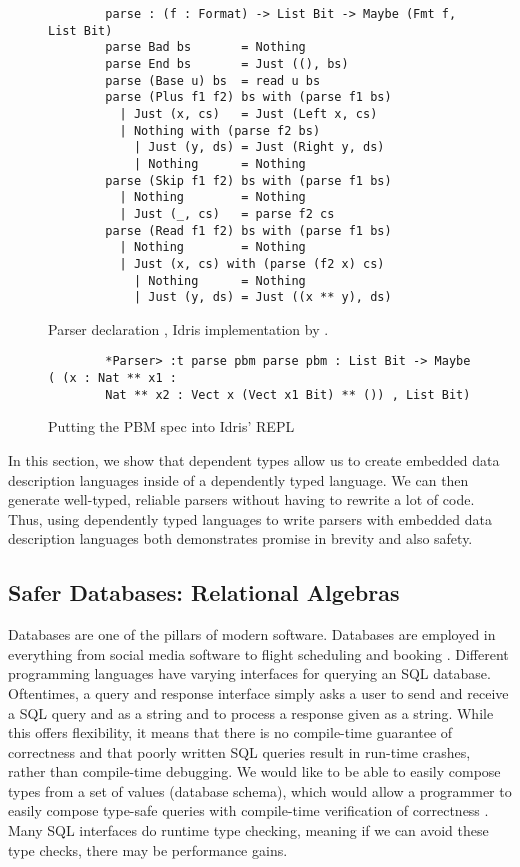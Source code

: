 \begin{figure}[h]
    \caption{Parser declaration \cite{power_of_pi}, Idris implementation by
    \cite{idris_pop}.}
    \label{parser}
    \begin{lstlisting}
        parse : (f : Format) -> List Bit -> Maybe (Fmt f, List Bit)
        parse Bad bs       = Nothing
        parse End bs       = Just ((), bs)
        parse (Base u) bs  = read u bs
        parse (Plus f1 f2) bs with (parse f1 bs)
          | Just (x, cs)   = Just (Left x, cs)
          | Nothing with (parse f2 bs)
            | Just (y, ds) = Just (Right y, ds)
            | Nothing      = Nothing
        parse (Skip f1 f2) bs with (parse f1 bs)
          | Nothing        = Nothing
          | Just (_, cs)   = parse f2 cs
        parse (Read f1 f2) bs with (parse f1 bs)
          | Nothing        = Nothing
          | Just (x, cs) with (parse (f2 x) cs)
            | Nothing      = Nothing
            | Just (y, ds) = Just ((x ** y), ds)
    \end{lstlisting}
\end{figure}

\begin{figure}
    \caption{Putting the PBM spec into Idris' REPL}
    \label{repl}
    \begin{lstlisting}
        *Parser> :t parse pbm parse pbm : List Bit -> Maybe ( (x : Nat ** x1 :
        Nat ** x2 : Vect x (Vect x1 Bit) ** ()) , List Bit)
    \end{lstlisting}
\end{figure}

In this section, we show that dependent types allow us to create embedded data
description languages inside of a dependently typed language. We can then
generate well-typed, reliable parsers without having to rewrite a lot of code.
Thus, using dependently typed languages to write parsers with embedded data
description languages both demonstrates promise in brevity and also safety. 

\subsection{Safer Databases: Relational Algebras}

Databases are one of the pillars of modern software. Databases are employed in
everything from social media software \cite{tao} to flight scheduling and
booking \cite{flights}. Different programming languages have varying interfaces
for querying an SQL database. Oftentimes, a query and response interface simply
asks a user to send and receive a SQL query and as a string and to process a
response given as a string. While this offers flexibility, it means that there
is no compile-time guarantee of correctness and that poorly written SQL queries
result in run-time crashes, rather than compile-time debugging. We would like to
be able to easily compose types from a set of values (database schema), which
would allow a programmer to easily compose type-safe queries with compile-time
verification of correctness \cite{power_of_pi}. Many SQL interfaces do runtime
type checking, meaning if we can avoid these type checks, there may be
performance gains. 

